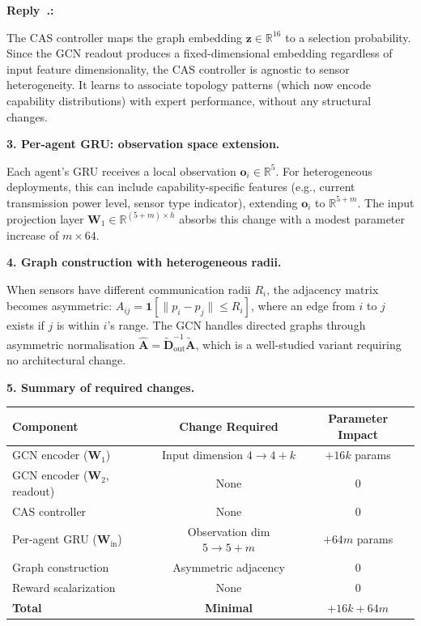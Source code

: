 \documentclass[11pt]{article}
\newcounter{reviewer}
\newcounter{replyctr}[reviewer]
\renewcommand{\thereplyctr}{\thereviewer.\arabic{replyctr}}
\newenvironment{reply}
  {\refstepcounter{replyctr}%
   \addtocounter{replyctr}{-1}%
   \medskip\noindent
   \begin{sf}\textbf{Reply~\thereplyctr:}\ }
  {\addtocounter{replyctr}{1}%
   \medskip\end{sf}}
\begin{document}
\begin{reply}
\begin{mdframed}[style=Resp]
The CAS controller maps the graph embedding $\mathbf{z} \in \mathbb{R}^{16}$ to a selection probability. Since the GCN readout produces a fixed-dimensional embedding regardless of input feature dimensionality, the CAS controller is agnostic to sensor heterogeneity. It learns to associate topology patterns (which now encode capability distributions) with expert performance, without any structural changes.

\medskip
\noindent\textbf{3. Per-agent GRU: observation space extension.}

Each agent's GRU receives a local observation $\mathbf{o}_i \in \mathbb{R}^5$. For heterogeneous deployments, this can include capability-specific features (e.g., current transmission power level, sensor type indicator), extending $\mathbf{o}_i$ to $\mathbb{R}^{5+m}$. The input projection layer $\mathbf{W}_1 \in \mathbb{R}^{(5+m) \times h}$ absorbs this change with a modest parameter increase of $m \times 64$.

\medskip
\noindent\textbf{4. Graph construction with heterogeneous radii.}

When sensors have different communication radii $R_i$, the adjacency matrix becomes asymmetric: $A_{ij} = \mathbf{1}[\|p_i - p_j\| \leq R_i]$, where an edge from $i$ to $j$ exists if $j$ is within $i$'s range. The GCN handles directed graphs through asymmetric normalisation $\hat{\mathbf{A}} = \tilde{\mathbf{D}}_{\text{out}}^{-1}\tilde{\mathbf{A}}$, which is a well-studied variant requiring no architectural change.

\medskip
\noindent\textbf{5. Summary of required changes.}

\begin{center}
\begin{tabular}{lcc}
\toprule
\textbf{Component} & \textbf{Change Required} & \textbf{Parameter Impact} \\
\midrule
GCN encoder ($\mathbf{W}_1$) & Input dimension $4 \to 4+k$ & $+16k$ params \\
GCN encoder ($\mathbf{W}_2$, readout) & None & 0 \\
CAS controller & None & 0 \\
Per-agent GRU ($\mathbf{W}_{\text{in}}$) & Observation dim $5 \to 5+m$ & $+64m$ params \\
Graph construction & Asymmetric adjacency & 0 \\
Reward scalarization & None & 0 \\
\midrule
\textbf{Total} & \textbf{Minimal} & $+16k + 64m$ \\
\bottomrule
\end{tabular}
\end{center}


\end{mdframed}
\end{reply}
\end{document}
